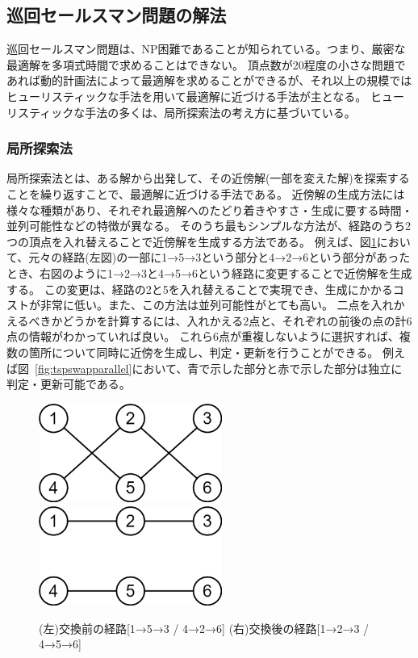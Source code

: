 \subsection{巡回セールスマン問題の解法}
巡回セールスマン問題は、NP困難であることが知られている。つまり、厳密な最適解を多項式時間で求めることはできない。
頂点数が20程度の小さな問題であれば動的計画法によって最適解を求めることができるが、それ以上の規模ではヒューリスティックな手法を用いて最適解に近づける手法が主となる。
ヒューリスティックな手法の多くは、局所探索法の考え方に基づいている。
\subsubsection{局所探索法}\label{sec:local}
局所探索法とは、ある解から出発して、その近傍解(一部を変えた解)を探索することを繰り返すことで、最適解に近づける手法である。\cite{HouTengYouTaiXunHuiserusumanWenTiTSPNoJiBenDenaJiekiFang2021}
近傍解の生成方法には様々な種類があり、それぞれ最適解へのたどり着きやすさ・生成に要する時間・並列可能性などの特徴が異なる。
そのうち最もシンプルな方法が、経路のうち2つの頂点を入れ替えることで近傍解を生成する方法である。
例えば、図\ref{fig:tspswap}において、元々の経路(左図)の一部に1→5→3という部分と4→2→6という部分があったとき、右図のように1→2→3と4→5→6という経路に変更することで近傍解を生成する。
この変更は、経路の2と5を入れ替えることで実現でき、生成にかかるコストが非常に低い。また、この方法は並列可能性がとても高い。
二点を入れかえるべきかどうかを計算するには、入れかえる2点と、それぞれの前後の点の計6点の情報がわかっていれば良い。
これら6点が重複しないように選択すれば、複数の箇所について同時に近傍を生成し、判定・更新を行うことができる。
例えば図~\ref{fig:tspswapparallel}において、青で示した部分と赤で示した部分は独立に判定・更新可能である。
\begin{figure}[h]
    \begin{center}
        \includegraphics[width=6cm]{figure/swap_bad.png}
        \includegraphics[width=6cm]{figure/swap_good.png}
        \caption{
            (左)交換前の経路[1→5→3 / 4→2→6]
            (右)交換後の経路[1→2→3 / 4→5→6]
        }\label{fig:tspswap}
    \end{center}
\end{figure}


